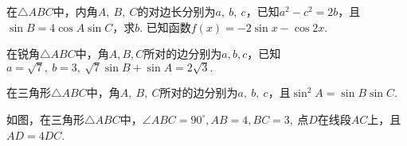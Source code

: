 \begin{questions}
\kongbai
\qs 在$\triangle ABC$中，内角$ A,\ B,\ C $的对边长分别为$ a,\ b,\ c $，已知$ a^2-c^2=2b $，且$ \sin B=4\cos A\sin C $，求$ b $.
\kongbai
\qs 已知函数$f(x)=-2\sin x-\cos 2x$.
\kongbai
\qs 在锐角$\triangle ABC$中，角$ A,B,C $所对的边分别为$ a,b,c $，已知$ a=\sqrt{7},\ b=3,\ \sqrt{7}\sin B+\sin A=2\sqrt{3}.$
\kongbai
\qs 在三角形$\triangle ABC$中，角$ A,\ B,\ C $所对的边分别为$ a,\ b,\ c $，且$ \sin^2 A=\sin B\sin C $.
\kongbai
\qs 如图，在三角形$\triangle ABC$中，$ \angle ABC=90^{\circ} ,AB=4,BC=3,\ $点$ D $在线段$ AC $上，且$ AD=4DC $.
\end{questions}
